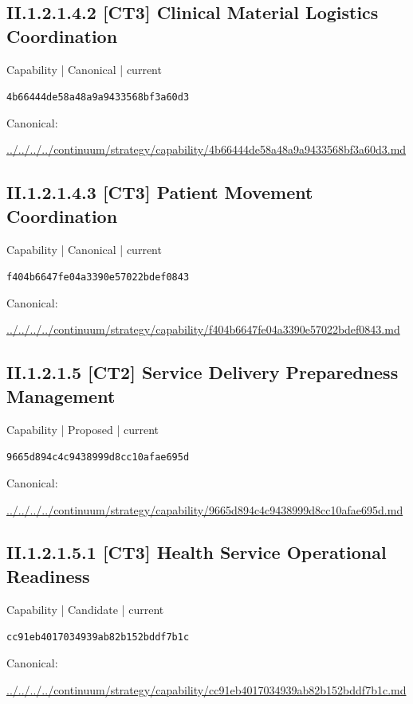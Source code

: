 \documentclass[10pt,a4paper]{article}
\begin{document}
\subsection*{II.1.2.1.4.2 [CT3] Clinical Material Logistics Coordination}
\label{element-4b66444de58a48a9a9433568bf3a60d3}
{\small Capability | Canonical | current}\par
\texttt{4b66444de58a48a9a9433568bf3a60d3}\par
Canonical: \par
{\footnotesize\url{../../../../continuum/strategy/capability/4b66444de58a48a9a9433568bf3a60d3.md}}\par
\subsection*{II.1.2.1.4.3 [CT3] Patient Movement Coordination}
\label{element-f404b6647fe04a3390e57022bdef0843}
{\small Capability | Canonical | current}\par
\texttt{f404b6647fe04a3390e57022bdef0843}\par
Canonical: \par
{\footnotesize\url{../../../../continuum/strategy/capability/f404b6647fe04a3390e57022bdef0843.md}}\par
\subsection*{II.1.2.1.5 [CT2] Service Delivery Preparedness Management}
\label{element-9665d894c4c9438999d8cc10afae695d}
{\small Capability | Proposed | current}\par
\texttt{9665d894c4c9438999d8cc10afae695d}\par
Canonical: \par
{\footnotesize\url{../../../../continuum/strategy/capability/9665d894c4c9438999d8cc10afae695d.md}}\par
\subsection*{II.1.2.1.5.1 [CT3] Health Service Operational Readiness}
\label{element-cc91eb4017034939ab82b152bddf7b1c}
{\small Capability | Candidate | current}\par
\texttt{cc91eb4017034939ab82b152bddf7b1c}\par
Canonical: \par
{\footnotesize\url{../../../../continuum/strategy/capability/cc91eb4017034939ab82b152bddf7b1c.md}}\par
\end{document}
